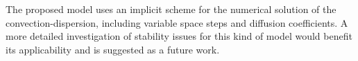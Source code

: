 
The proposed model uses an implicit scheme for the numerical solution of the convection-dispersion, including variable space steps and diffusion coefficients.
A more detailed investigation of stability issues for this kind of model would benefit its applicability and is suggested as a future work.

% 
%
%
%








